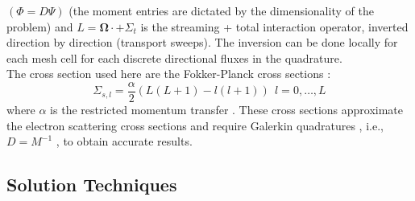 \documentclass[preprint,10pt]{elsarticle}
\newcommand\bo{\boldsymbol{\Omega}}
\renewcommand{\(}{\left(}
\renewcommand{\)}{\right)}
\renewcommand{\[}{\left[}
\renewcommand{\]}{\right]}
\begin{document}
$(\Phi=D\Psi)$ (the moment entries are dictated  by the dimensionality of the
problem) and $L = \bo\cdot + \Sigma_t$ is the streaming + total interaction operator,
inverted direction by direction (transport sweeps). The inversion can be done
locally for each mesh cell for each discrete directional fluxes in the
quadrature.\\
The cross section used here are the Fokker-Planck cross sections :
\begin{equation}
\Sigma_{s,l}=\frac{\alpha}{2} (L(L+1)-l(l+1))\ \ l=0,\hdots,L
\end{equation}
where $\alpha$ is the restricted momentum transfer \cite{morel_96}.
These cross sections approximate the electron scattering cross sections
\cite{morel_81} and require Galerkin quadratures , i.e.,
$D=M^{-1}$ \cite{graal}, to obtain accurate results.


\subsection{Solution Techniques} \label{sec:sn_iterative_review}
\end{document}
